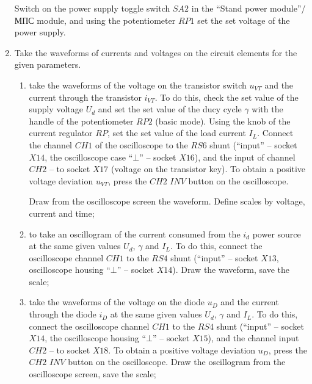 \documentclass[a4paper,14pt]{article}
\begin{document}
\begin{enumerate}
Switch on the power supply toggle switch $SA2$ in the ``Stand power module''/МПС module, 
and using the potentiometer $RP1$ set the set voltage of the power supply.

\item Take the waveforms of currents and voltages on the circuit elements for the given parameters.

\begin{enumerate}
\item take the waveforms of the voltage on the transistor switch $u_{VT}$ and the current through the transistor $i_{VT}$.
To do this, check the set value of the supply voltage $U_d$ and set the set value of the ducy cycle $\gamma$ 
		with the handle of the potentiometer $RP2$ (basic mode).
Using the knob of the current regulator $RP$, set the set value of the load current $I_L$.
Connect the channel $CH1$ of the oscilloscope to the $RS6$ shunt (``input''  -- socket $X14$, 
the oscilloscope case ``$\bot$'' -- socket $X16$), 
		and the input of channel $CH2$ -- to socket $X17$ (voltage on the transistor key).
To obtain a positive voltage deviation $u_{VT}$, press the $CH2$ $INV$ button on the oscilloscope.


Draw from the oscilloscope screen the waveform. Define scales by voltage, current and time;

\item to take an oscillogram of the current consumed from the $i_d$ power source at the same given values $U_d$, 
$\gamma$ and $I_L$.
To do this, connect the oscilloscope channel $CH1$ to the $RS4$ shunt (``input'' -- socket $X13$, 
oscilloscope housing ``$\bot$'' -- socket $X14$). Draw the waveform, save the scale;

\item take the waveforms of the voltage on the diode $u_D$ and the current through the diode $i_D$ at the same given values $U_d$,
$\gamma$ and $I_L$. To do this, connect the oscilloscope channel $CH1$ to the $RS4$ shunt (``input'' -- socket $X14$, 
the oscilloscope housing ``$\bot$'' -- socket $X15$), and the channel input $CH2$ -- to socket $X18$.
To obtain a positive voltage deviation $u_D$, press the $CH2$ $INV$ button on the oscilloscope.
Draw the oscillogram from the oscilloscope screen, save the scale;


\end{enumerate}
\end{enumerate}
\end{document}
